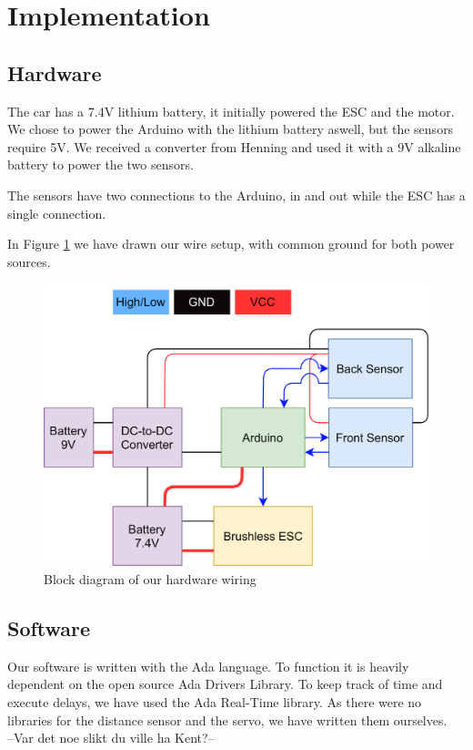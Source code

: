 \documentclass{article}
\begin{document}
\section{Implementation}

\subsection{Hardware}
The car has a 7.4V lithium battery, it initially powered the ESC and the motor. We chose to power the Arduino with the lithium battery aswell, but the sensors require 5V. We received a converter from Henning and used it with a 9V alkaline battery to power the two sensors.

The sensors have two connections to the Arduino, in and out while the ESC has a single connection.

In Figure \ref{Hardware} we have drawn our wire setup, with common ground for both power sources.
\begin{figure}[H]
  \centering
  \includegraphics[width=\linewidth]{hardware.png}
  \caption{Block diagram of our hardware wiring}
  \label{Hardware}
\end{figure}

\subsection{Software}
Our software is written with the Ada language. To function it is heavily dependent on the open source Ada Drivers Library. To keep track of time and execute delays, we have used the Ada Real-Time library. As there were no libraries for the distance sensor and the servo, we have written them ourselves.\\
--Var det noe slikt du ville ha Kent?--
\end{document}
